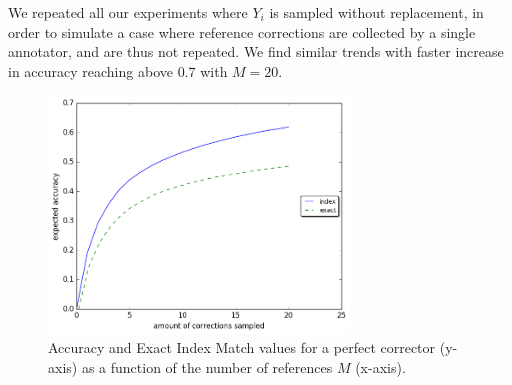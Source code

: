 \documentclass[letter,11pt]{article}
\begin{document}
We repeated all our experiments where $Y_i$ is sampled without replacement,
in order to simulate a case where reference corrections are collected by a single
annotator, and are thus not repeated. We find similar trends with faster increase in accuracy reaching above $0.7$ with $M=20$.





\begin{figure}
  \includegraphics[width=8cm]{noSig_repeat_1000_accuracy}
  \caption{Accuracy and Exact Index Match values for a perfect corrector (y-axis)
    as a function of the number of references $M$ (x-axis).
  } \label{fig:accuracy_vals}
\end{figure}
\end{document}
